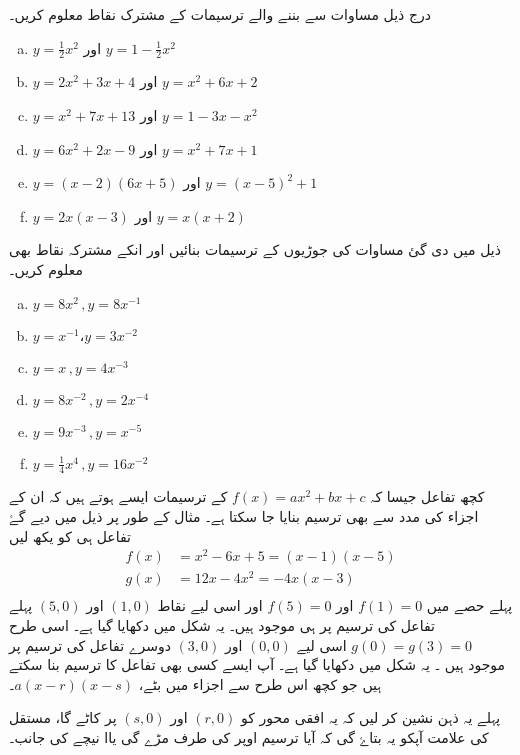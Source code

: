 درج ذیل مساوات سے بننے والے ترسیمات کے مشترک نقاط معلوم کریں۔ 
\begin{enumerate}[a.]
\item \(    y=\frac{1}{2}x^{2}  \)           اور  \(  y=1-\frac{1}{2}x^{2}   \)
\item \(   y=2x^{2}+3x+4    \) اور  \(    y=x^{2}+6x+2               \)
\item \(   y=x^{2}+7x+13     \) اور  \(      y=1-3x-x^{2}    \)
\item \(   y=6x^{2}+2x-9   \)           اور  \( y=x^{2}+7x+1    \)
\item \(   y=(x-2)(6x+5)    \) اور  \(     y=(x-5)^{2}+1               \)
\item \(    y=2x(x-3)    \) اور  \(   y=x(x+2)       \)
  \end{enumerate}
ذیل میں دی گئ مساوات کی جوڑیوں کے ترسیمات بنائیں اور انکے مشترکہ نقاط بھی معلوم کریں۔
 \begin{enumerate}[a.]
\item \(y=8x^{2}\,,y=8x^{-1}  \)
\item \( y=x^{-1}، y=3x^{-2} \)
\item \(y=x\,,y=4x^{-3} \)
\item \( y=8x^{-2}\,,y=2x^{-4} \)
\item \( y=9x^{-3}\,,y=x^{-5} \)
\item \(y=\frac{1}{4}x^{4}\,,y=16x^{-2} \)
\end{enumerate}
کچھ تفاعل جیسا کہ \(f(x)=ax^{2}+bx+c\) کے ترسیمات ایسے ہوتے ہیں کہ ان کے اجزاء کی مدد سے بھی ترسیم بنایا جا سکتا ہے۔ مثال کے طور پر  ذیل میں دیے گۓ تفاعل ہی کو یکھ لیں 
\begin{align*}
f(x)&=x^{2}-6x+5=(x-1)(x-5)\\
g(x)&=12x-4x^{2}=-4x(x-3)\\
\end{align*}
پہلے حصے میں \( f(1)=0 \) اور \(  f(5)=0  \) اور اسی لیے نقاط \(   (1,0)    \) اور \(  (5,0)    \) پہلے تفاعل کی ترسیم پر ہی موجود ہیں۔
یہ شکل  میں دکھایا گیا ہے۔
اسی طرح \(  g(0)=g(3)=0   \) اسی لیے \(  (0,0)  \) اور \( (3,0)  \) دوسرے تفاعل کی ترسیم پر موجود ہیں ۔ یہ شکل  میں دکھایا گیا ہے۔
 آپ ایسے کسی بھی تفاعل کا ترسیم بنا سکتے ہیں جو کچھ اس طرح سے اجزاء میں بٹے، \(a(x-r)(x-s)\)۔ 

پہلے یہ ذہن نشین کر لیں کہ یہ افقی محور کو \((r,0)  \) اور \((s,0)   \) پر کاٹے گا، مستقل  کی علامت آپکو یہ بتاۓ گی کہ آیا ترسیم اوپر کی طرف مڑے گی یاا نیچے کی جانب۔

